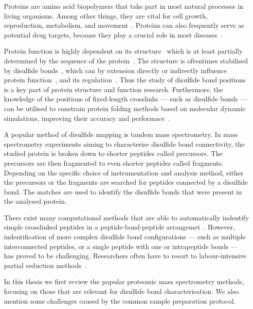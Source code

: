 

Proteins are amino acid biopolymers that take part in most natural processes in living organisms. Among other things, they are vital for cell growth, reproduction, metabolism, and movement~\cite{johnson1994sequential, prescott1968regulation, ketelaar2004actin, elston1998energy}. Proteins can also frequently serve as potential drug targets, because they play a crucial role in most diseases~\cite{konopatskaya2010protein, yamin2008amyloid}.

Protein function is highly dependent on its structure~\cite{orengo1999protein} which is at least partially determined by the sequence of the protein~\cite{anfinsen1973principles}. The structure is oftentimes stabilised by disulfide bonds~\cite{wedemeyer2000disulfide, mcauley2008contributions}, which can by extension directly or indirectly influence protein function~\cite{nagahara2011intermolecular}, and its regulation~\cite{chiu2019allosteric}. Thus the study of disulfide bond positions is a key part of protein structure and function research. Furthermore, the knowledge of the positions of fixed-length crosslinks --- such as disulfide bonds --- can be utilised to constrain protein folding methods based on molecular dynamic simulations, improving their accuracy and performace~\cite{brodie2017solving}.

A popular method of disulfide mapping is tandem mass spectrometry. In mass spectrometry experiments aiming to characterise disulfide bond connectivity, the studied protein is broken down to shorter peptides called precursors. The precursors are then fragmented to even shorter peptides called fragments. Depending on the specific choice of instrumentation and analysis method, either the precursors or the fragments are searched for peptides connected by a disulfide bond. The matches are used to identify the disulfide bonds that were present in the analysed protein.

There exist many computational methods that are able to automatically indentify simple crosslinked peptides in a peptide-bond-peptide arrangemet~\cite{lakbub2018recent, liu2014facilitating}. However, indentification of more complex disulfide bond configurations --- such as multiple interconnected peptides, or a single peptide with one or intrapeptide bonds --- has proved to be challenging. Researchers often have to resort to labour-intensive partial reduction methods~\cite{wu1997novel, li2013disulfide}.

In this thesis we first review the popular proteomic mass spectrometry methods, focusing on those that are relevant for disulfide bond characterisation. We also mention some challenges caused by the common sample preparation protocol.


